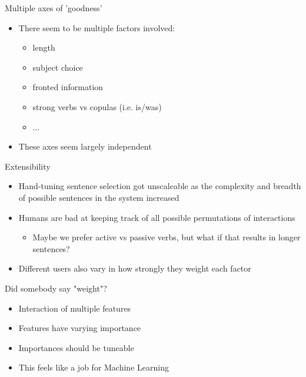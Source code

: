 \documentclass[10pt, compress]{beamer}
\begin{document}
\begin{frame}{Multiple axes of 'goodness'}
	\begin{itemize}
		\item There seem to be multiple factors involved:
		\begin{itemize}
			\item length
			\item subject choice
			\item fronted information
			\item strong verbs vs copulas (i.e. is/was)
			\item ...	\pause
		\end{itemize}
		\item These axes seem largely independent
	\end{itemize}
\end{frame}

\begin{frame}{Extensibility}
	\begin{itemize}
		\item Hand-tuning sentence selection got unscaleable as the complexity
            and breadth of possible sentences in the system increased
		\item Humans are bad at keeping track of all possible permutations of interactions \pause
		\begin{itemize}
			\item Maybe we prefer active vs passive verbs, but what if that results in longer sentences? \pause
		\end{itemize}
		\item Different users also vary in how strongly they weight each factor
	\end{itemize}
\end{frame}

\begin{frame}{Did somebody say "weight"?}
	\begin{itemize}
		\item Interaction of multiple features %
		\item Features have varying importance %
		\item Importances should be tuneable \pause %
		\item This feels like a job for Machine Learning
	\end{itemize}
\end{frame}
\end{document}
